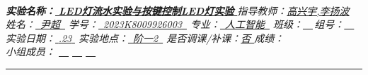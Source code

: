 \documentclass[UTF8]{article}
\theoremstyle{MyLineTheoremStyle} %
\theoremstyle{MyBlockTheoremStyle} %
\theoremstyle{MySubsubsectionStyle} %
\begin{document}


\begin{center}\large
    \\\vspace{0.4cm}
    \noindent\textit{
        \textbf{\bfseries 实验名称：}\uline{\hspace{0.5cm} \bfseries LED灯流水实验与按键控制LED灯实验 \hspace{0.5cm}}\hspace{0.4cm} 
        指导教师：\uline{\hspace{0.5cm}高兴宇,李扬波\hspace{0.5cm}}}
    \\\vspace{0.1cm}
    \noindent\textit{
        姓名：\uline{\,\,\,尹超\,\,\,}\hspace{0.2cm}
        学号：\uline{\,\,\,{\upshape 2023K8009926003}\,\,\,}\hspace{0.2cm}
        专业：\uline{\,\,\,人工智能\,\,\,}\hspace{0.2cm}
        班级：\uline{\,\,\,\,\,\,}\,组号：\uline{\,\,\,\,\,\,}}
    \\\vspace{0.1cm}
    \noindent\textit{
        实验日期：\uline{\,\,{.23}\,\,}\hspace{0.2cm}
        实验地点：\uline{\,\,\,{\upshape 阶一2}\,\,\,}\hspace{0.2cm}
        是否调课/补课：\uline{\hspace{0.26cm}否 \hspace{0.26cm}}\hspace{0.2cm}
        成绩：\uline{\hspace{2cm}}}
    \\\vspace{0.1cm}
    \noindent\textit{
        小组成员：
        \uline{\,\,\,\,\,\,}\hspace{0.2cm}
        \uline{\,\,\,\,\,\,}\hspace{0.2cm}
        \uline{\,\,\,\,\,\,}\hspace{0.2cm}
    }
\end{center}
\noindent\rule{\textwidth}{0.1em}   %
\end{document}
